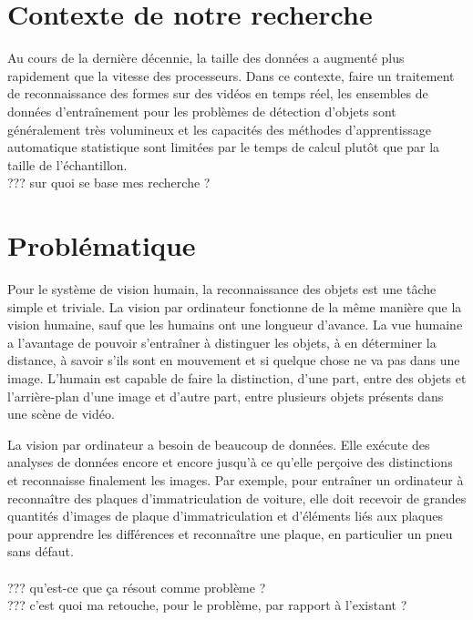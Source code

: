 		

	\section{Contexte de notre recherche}
		Au cours de la dernière décennie, la taille des données a augmenté plus rapidement que la vitesse des processeurs. 
		Dans ce contexte, faire un traitement de reconnaissance des formes sur des vidéos en temps réel, les ensembles de données d'entraînement pour les problèmes de détection d'objets sont généralement très volumineux et les capacités des méthodes d'apprentissage automatique statistique sont limitées par le temps de calcul plutôt que par la taille de l'échantillon.\cite{bottou2010large} 
		\\??? sur quoi se base mes recherche ?
	
	\section{Problématique}
		
		Pour le système de vision humain, la reconnaissance des objets est une tâche simple et triviale.
		La vision par ordinateur fonctionne de la même manière que la vision humaine, sauf que les humains ont une longueur d'avance. La vue humaine a l'avantage de pouvoir s'entraîner à distinguer les objets, à en déterminer la distance, à savoir s'ils sont en mouvement et si quelque chose ne va pas dans une image. 
		L'humain est capable de faire la distinction, d'une part, entre des objets et l'arrière-plan d'une image et d'autre part, entre plusieurs objets présents dans une scène de vidéo.
		
		La vision par ordinateur a besoin de beaucoup de données. Elle exécute des analyses de données encore et encore jusqu'à ce qu'elle perçoive des distinctions et reconnaisse finalement les images. Par exemple, pour entraîner un ordinateur à reconnaître des plaques d'immatriculation de voiture, elle doit recevoir de grandes quantités d'images de plaque d'immatriculation et d'éléments liés aux plaques pour apprendre les différences et reconnaître une plaque, en particulier un pneu sans défaut.\\
		\\??? qu'est-ce que ça résout comme problème ?
		\\??? c'est quoi ma retouche, pour le problème, par rapport à l'existant ?
	
